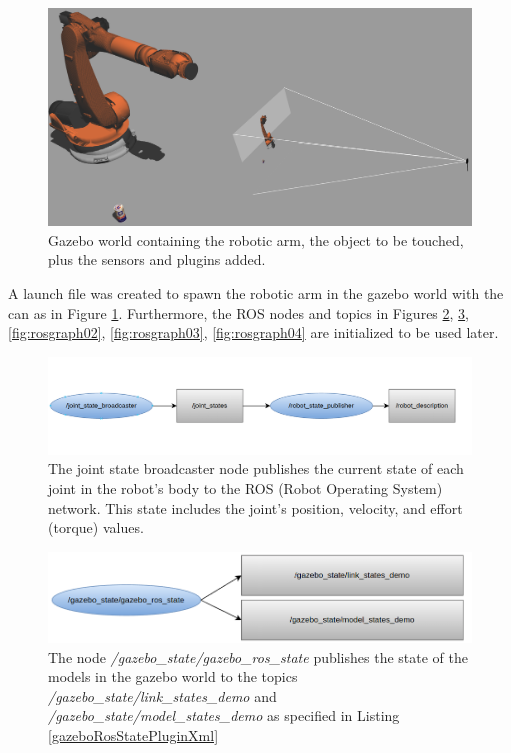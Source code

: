 \documentclass[12pt,oneside]{article}
\begin{document}
\begin{figure}[H]
	\centering
	\includegraphics[width=0.95\linewidth]{kuka4}
	\caption[Gazebo World.]{Gazebo world containing the robotic arm, the object to be touched, plus the sensors and plugins added.}
	\label{fig:kuka4}
\end{figure}

A launch file was created to spawn the robotic arm in the gazebo world with the can as in Figure \ref{fig:kuka4}. Furthermore, the ROS nodes and topics in Figures \ref{fig:rosgraph00}, \ref{fig:rosgraph01}, \ref{fig:rosgraph02}, \ref{fig:rosgraph03}, \ref{fig:rosgraph04} are initialized to be used later.


\begin{figure}[H]
\centering
\includegraphics[width=0.95\linewidth]{rosgraph00}
\caption[The joint\_state\_broadcaster node.]{The joint state broadcaster node publishes the current state of each joint in the robot's body to the ROS (Robot Operating System) network. This state includes the joint's position, velocity, and effort (torque) values. }
\label{fig:rosgraph00}
\end{figure}
 
\begin{figure}[H]
\centering
\includegraphics[width=0.95\linewidth]{rosgraph01_n}
\caption[The gazebo\_ros\_state node.]{The node \textit{/gazebo\_state/gazebo\_ros\_state} publishes the state of the models in the gazebo world to the topics \textit{/gazebo\_state/link\_states\_demo} and \textit{/gazebo\_state/model\_states\_demo} as specified in Listing \ref{gazeboRosStatePluginXml}}
\label{fig:rosgraph01}
\end{figure}
\end{document}
